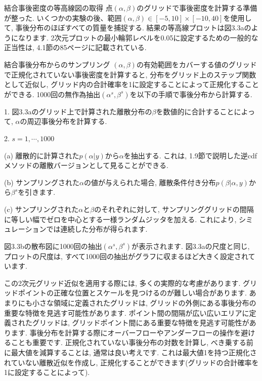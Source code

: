 \documentclass[10pt,dvipdfmx,a4]{beamer}
\begin{document}

\begin{frame}{結合事後密度の等高線図の取得}
点$(\alpha,\beta)$のグリッドで事後密度を計算する準備が整った.
いくつかの実験の後、範囲$(\alpha,\beta)\in[-5,10]\times[-10,40]$を使用して, 事後分布のほぼすべての質量を捕捉する.
結果の等高線プロットは図3.3aのようになります.
2次元プロットの最小輪郭レベルを0.05に設定するための一般的な正当性は, 4.1節の85ページに記載されている.\end{frame}


\begin{frame}{結合事後分布からのサンプリング}
$(\alpha,\beta)$の有効範囲をカバーする値のグリッドで正規化されていない事後密度を計算すると, 分布をグリッド上のステップ関数として近似し, グリッド内の合計確率を1に設定することによって正規化することができる.
1000回の無作為抽出$(\alpha^s,\beta^s)$を以下の手順で事後分布から計算する.

1. 図3.3aのグリッド上で計算された離散分布の$\beta$を数値的に合計することによって, $\alpha$の周辺事後分布を計算する.

2. $s=1,\cdots,1000$

(a) 離散的に計算された$p(\alpha|y)$から$\alpha$を抽出する.
これは, 1.9節で説明した逆cdfメソッドの離散バージョンとして見ることができる.

(b) サンプリングされた$\alpha$の値が与えられた場合, 離散条件付き分布$p(\beta|\alpha,y)$から$\beta^s$を引きます.

(c) サンプリングされた$\alpha$と$\beta$のそれぞれに対して, サンプリンググリッドの間隔に等しい幅でゼロを中心とする一様ランダムジッタを加える.
これにより, シミュレーションでは連続した分布が得られます.
\end{frame}


\begin{frame}
図3.3bの散布図に1000回の抽出$(\alpha^s,\beta^s)$が表示されます.
図3.3aの尺度と同じ, プロットの尺度は, すべて1000回の抽出がグラフに収まるほど大きく設定されています.

この2次元グリッド近似を適用する際には, 多くの実際的な考慮があります.
グリッドポイントの正確な位置とスケールを見つけるのが難しい場合があります.
あまりにも小さな領域に定義されたグリッドは, グリッドの外側にある事後分布の重要な特徴を見逃す可能性があります.
ポイント間の間隔が広い広いエリアに定義されたグリッドは, グリッドポイント間にある重要な特徴を見逃す可能性があります.
事後分布を計算する際にオーバーフローやアンダーフローの操作を避けることも重要です.
正規化されていない事後分布の対数を計算し, べき乗する前に最大値を減算することは, 通常は良い考えです.
これは最大値1を持つ正規化されていない離散近似を作成し, 正規化することができます(グリッドの合計確率を1に設定することによって).
\end{frame}
\end{document}

